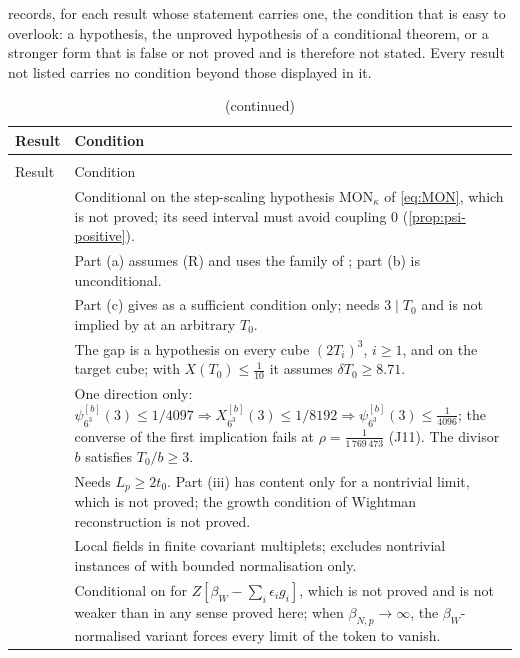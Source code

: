 \documentclass[11pt,a4paper]{amsart}
\theoremstyle{definition}
\theoremstyle{remark}
\numberwithin{equation}{section}
\newcommand{\cube}[1]{(2#1)^3}             %
\newcommand{\dconst}{\frac{1}{4097}}       %
\newcommand{\xconst}{\frac{1}{8192}}       %
\newcommand{\dconstinl}{1/4097}            %
\newcommand{\xconstinl}{1/8192}            %
\newcommand{\Mcirc}{\text{\upshape(M$^{\circ}$)}}   %
\newcommand{\hypW}{\text{\upshape(W)}}              %
\newcommand{\San}{\text{\upshape(S$'_{\mathrm{an}}$)}} %
\newcommand{\CW}{\text{\upshape(CW)}}               %
\newcommand{\tzero}{t_0}                   %
\newcommand{\Tzero}{T_0}                   %
\newcommand{\Lp}{L_p}                      %
\newcommand{\betaW}{\beta_{W}}             %
\begin{document}
 records, for each result whose statement carries one, the condition that is easy to overlook: a hypothesis, the unproved hypothesis of a conditional theorem, or a stronger form that is false or not proved and is therefore not stated. Every result not listed carries no condition beyond those displayed in it.

{\footnotesize\setlength{\tabcolsep}{3pt}\renewcommand{\arraystretch}{1.05}
\begin{longtable}{@{}p{}p{}@{}}
\caption{Conditions carried by the statements of the results.}\label{tab:verification}\\
\toprule
Result & Condition\\
\midrule
\endfirsthead
\caption[]{(continued)}\\
\toprule
Result & Condition\\
\midrule
\endhead
{}{prop:step-scaling} & Conditional on the step-scaling hypothesis $\mathrm{MON}_\kappa$ of \eqref{eq:MON}, which is not proved; its seed interval must avoid coupling $0$ (\cref{prop:psi-positive}).\\
{prop:step-rigidity} & Part (a) assumes (R) and uses the family of \cite{openaiym}; part (b) is unconditional.\\
{thm:decimation} & Part (c) gives \CW{} as a sufficient condition only; \CW{} needs $3\mid\Tzero$ and is not implied by \Mcirc{} at an arbitrary $\Tzero$.\\
{thm:dyadic-gap} & The gap is a hypothesis on every cube $\cube{T_i}$, $i\ge1$, and on the target cube; with $X(\Tzero)\le\frac1{10}$ it assumes $\delta\Tzero\ge8.71$.\\
{thm:upward-closed} & One direction only: $\psi^{[b]}_{6^3}(3)\le\dconstinl\Rightarrow X^{[b]}_{6^3}(3)\le\xconstinl\Rightarrow\psi^{[b]}_{6^3}(3)\le\frac1{4096}$; the converse of the first implication fails at $\rho=\frac1{1\,769\,473}$ (J11). The divisor $b$ satisfies $\Tzero/b\ge3$.\\
{thm:main} & Needs $\Lp\ge2\tzero$. Part (iii) has content only for a nontrivial limit, which is not proved; the growth condition of Wightman reconstruction is not proved.\\
{thm:bounded-tokens} & Local fields in finite covariant multiplets; excludes nontrivial instances of \hypW{} with bounded normalisation only.\\
{thm:San-UVB} & Conditional on \San{} for $Z[\betaW-\sum_i\epsilon_ig_i]$, which is not proved and is not weaker than \Mcirc{} in any sense proved here; when $\beta_{N,p}\to\infty$, the $\betaW$-normalised variant forces every limit of the token to vanish.\\

\end{longtable}}
\end{document}
